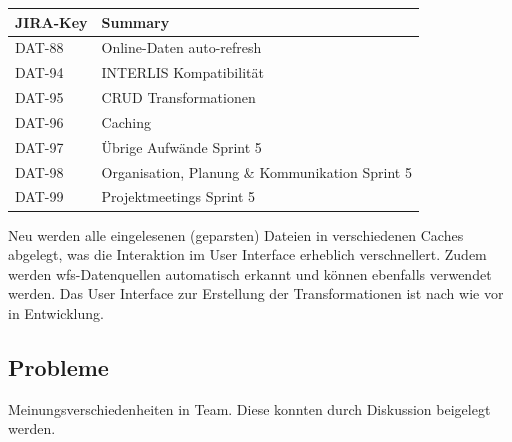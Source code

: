 \begin{table}[H]
\centering
\begin{tabular}{ll}
	\toprule
	\textbf{JIRA-Key} & \textbf{Summary}\\
	\midrule
DAT-88 & Online-Daten auto-refresh\\
DAT-94 & INTERLIS Kompatibilität\\
DAT-95 & CRUD Transformationen\\
DAT-96 & Caching\\
DAT-97 & Übrige Aufwände Sprint 5\\
DAT-98 & Organisation, Planung \& Kommunikation Sprint 5\\
DAT-99 & Projektmeetings Sprint 5\\
	\bottomrule
\end{tabular}	
\end{table}

Neu werden alle eingelesenen (geparsten) Dateien in verschiedenen Caches abgelegt, was die Interaktion im User Interface erheblich verschnellert. Zudem werden \acs{wfs}-Datenquellen automatisch erkannt und können ebenfalls verwendet werden. Das User Interface zur Erstellung der Transformationen ist nach wie vor in Entwicklung.

\subsection*{Probleme}
Meinungsverschiedenheiten in Team. Diese konnten durch Diskussion beigelegt werden.
